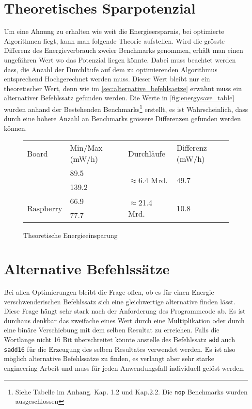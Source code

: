\section{Theoretisches Sparpotenzial}
Um eine Ahnung zu erhalten wie weit die Energieersparnis, bei optimierte Algorithmen liegt, kann man folgende Theorie aufstellen. Wird die grösste Differenz des Energieverbrauch zweier Benchmarks genommen, erhält man einen ungefähren Wert wo das Potenzial liegen könnte. Dabei muss beachtet werden dass, die Anzahl der Durchläufe auf dem zu optimierenden Algorithmus entsprechend Hochgerechnet werden muss. Dieser Wert bleibt nur ein theoretischer Wert, denn wie im \autoref{sec:alternative_befehlsaetze} erwähnt muss ein alternativer Befehlssatz gefunden werden. Die Werte in \autoref{fig:energysave_table} wurden anhand der Bestehenden Benchmarks\footnote{Siehe Tabelle im Anhang. Kap. 1.2 und Kap.2.2. Die \texttt{nop} Benchmarks wurden ausgeschlossen} erstellt, es ist Wahrscheinlich, dass durch eine höhere Anzahl an Benchmarks grössere Differenzen gefunden werden können.


\begin{figure}[H]
\center
\begin{tabular}{ |l|l|l|l| }
\hline
Board & Min/Max (mW/h) & Durchläufe & Differenz (mW/h) \\ \hhline{|=|=|=|=|}
\multirow{2}{*}{Galileo} & 89.5 & \multirow{2}{*}{$\approx$6.4 Mrd.} & \multirow{2}{*}{49.7} \\ 
 & 139.2 & &  \\ \hline
\multirow{2}{*}{Raspberry} & 66.9 & \multirow{2}{*}{$\approx$21.4 Mrd.} & \multirow{2}{*}{10.8} \\ 
 & 77.7 & &  \\
\hline
\end{tabular}
\caption{Theoretische Energieeinsparung}
\label{fig:energysave_table}
\end{figure}


\section{Alternative Befehlssätze}
\label{sec:alternative_befehlsaetze}
Bei allen Optimierungen bleibt die Frage offen, ob es für einen Energie verschwenderischen Befehlssatz sich eine gleichwertige alternative finden lässt. Diese Frage hängt sehr stark nach der Anforderung des Programmcode ab. Es ist durchaus denkbar das zweifache eines Wert durch eine Multiplikation oder durch eine binäre Verschiebung mit dem selben Resultat zu erreichen. Falls die Wortlänge nicht 16 Bit überschreitet könnte anstelle des Befehlssatz \texttt{add} auch \texttt{sadd16} für die Erzeugung des selben Resultates verwendet werden. Es ist also möglich alternative Befehlssätze zu finden, es verlangt aber sehr starke engineering Arbeit und muss für jeden Anwendungsfall individuell gelöst werden.


